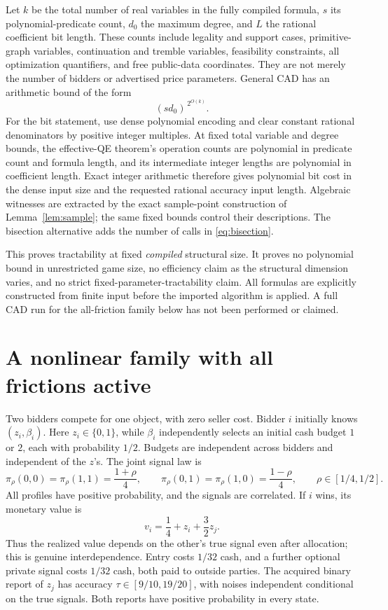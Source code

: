 \documentclass[11pt,a4paper]{article}
\numberwithin{equation}{section}
\theoremstyle{definition}
\begin{document}
Let \(k\) be the total number of real variables in the fully compiled
formula, \(s\) its polynomial-predicate count, \(d_0\) the maximum
degree, and \(L\) the rational coefficient bit length.
These counts include legality and support cases, primitive-graph
variables, continuation and tremble variables, feasibility constraints,
all optimization quantifiers, and free public-data coordinates.
They are not merely the number of bidders or advertised price parameters.
General CAD has an arithmetic bound of the form
\[
 (s d_0)^{\,2^{O(k)}}.
\]
For the bit statement, use dense polynomial encoding and clear constant
rational denominators by positive integer multiples.
At fixed total variable and degree bounds, the effective-QE theorem's
operation counts are polynomial in predicate count and formula length,
and its intermediate integer lengths are polynomial in coefficient
length. Exact integer arithmetic therefore gives polynomial bit cost
in the dense input size and the requested rational accuracy input length.
Algebraic witnesses are extracted by the exact sample-point construction
of Lemma~\ref{lem:sample}; the same fixed bounds control their descriptions.
The bisection alternative adds the number of calls in
\eqref{eq:bisection}.

This proves tractability at fixed \emph{compiled} structural size.
It proves no polynomial bound in unrestricted game size, no efficiency
claim as the structural dimension varies, and no strict
fixed-parameter-tractability claim.
All formulas are explicitly constructed from finite input before the
imported algorithm is applied.
A full CAD run for the all-friction family below has not been performed
or claimed.

\section{A nonlinear family with all frictions active}\label{sec:example}
Two bidders compete for one object, with zero seller cost.
Bidder \(i\) initially knows \((z_i,\beta_i)\).
Here \(z_i\in\{0,1\}\), while \(\beta_i\) independently selects an
initial cash budget \(1\) or \(2\), each with probability \(1/2\).
Budgets are independent across bidders and independent of the \(z\)'s.
The joint signal law is
\[
 \pi_\rho(0,0)=\pi_\rho(1,1)=\frac{1+\rho}{4},\qquad
 \pi_\rho(0,1)=\pi_\rho(1,0)=\frac{1-\rho}{4},
 \qquad \rho\in[1/4,1/2].
\]
All profiles have positive probability, and the signals are correlated.
If \(i\) wins, its monetary value is
\[
 v_i=\frac14+z_i+\frac32z_j.
\]
Thus the realized value depends on the other's true signal even after
allocation; this is genuine interdependence.
Entry costs \(1/32\) cash, and a further optional private signal costs
\(1/32\) cash, both paid to outside parties.
The acquired binary report of \(z_j\) has accuracy
\(\tau\in[9/10,19/20]\), with noises independent conditional on the
true signals. Both reports have positive probability in every state.
\end{document}
